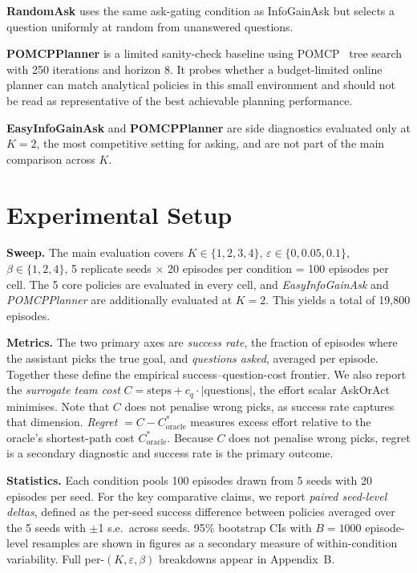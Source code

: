 \documentclass[10pt,twocolumn]{article}
\begin{document}
\textbf{RandomAsk} uses the same ask-gating condition as InfoGainAsk but selects a question uniformly at random from unanswered questions.

\textbf{POMCPPlanner} is a limited sanity-check baseline using POMCP~\cite{silver2010pomcp} tree search with 250 iterations and horizon 8. It probes whether a budget-limited online planner can match analytical policies in this small environment and should not be read as representative of the best achievable planning performance.

\textbf{EasyInfoGainAsk} and \textbf{POMCPPlanner} are side diagnostics evaluated only at $K{=}2$, the most competitive setting for asking, and are not part of the main comparison across $K$.

\section{Experimental Setup}
\label{sec:setup}

\textbf{Sweep.}
The main evaluation covers $K \in \{1,2,3,4\}$, $\varepsilon \in \{0, 0.05, 0.1\}$, $\beta \in \{1, 2, 4\}$, 5 replicate seeds $\times$ 20 episodes per condition = 100 episodes per cell.
The 5 core policies are evaluated in every cell, and \textit{EasyInfoGainAsk} and \textit{POMCPPlanner} are additionally evaluated at $K{=}2$.
This yields a total of 19{,}800 episodes.

\textbf{Metrics.}
The two primary axes are \textit{success rate}, the fraction of episodes where the assistant picks the true goal, and \textit{questions asked}, averaged per episode.
Together these define the empirical success--question-cost frontier.
We also report the \textit{surrogate team cost} $C {=} \text{steps} {+} c_q {\cdot} |\text{questions}|$, the effort scalar AskOrAct minimises. Note that $C$ does not penalise wrong picks, as success rate captures that dimension.
\textit{Regret} $= C - C^*_{\text{oracle}}$ measures excess effort relative to the oracle's shortest-path cost $C^*_{\text{oracle}}$.
Because $C$ does not penalise wrong picks, regret is a secondary diagnostic and success rate is the primary outcome.

\textbf{Statistics.}
Each condition pools 100 episodes drawn from 5 seeds with 20 episodes per seed.
For the key comparative claims, we report \textit{paired seed-level deltas}, defined as the per-seed success difference between policies averaged over the 5 seeds with $\pm$1 s.e.\ across seeds.
95\% bootstrap CIs with $B{=}1000$ episode-level resamples are shown in figures as a secondary measure of within-condition variability.
Full per-$(K,\varepsilon,\beta)$ breakdowns appear in Appendix~B.
\end{document}
